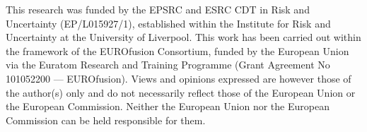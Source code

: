 \documentclass[twocolumn]{rps-esrel2022}
\begin{document}
\begin{acknowledgement}
This research was funded by the EPSRC and ESRC CDT in Risk and Uncertainty (EP/L015927/1), established within the Institute for Risk and Uncertainty at the University of Liverpool.
This work has been carried out within the framework of the EUROfusion Consortium, funded by the European Union via the Euratom Research and Training Programme (Grant Agreement No 101052200 — EUROfusion). Views and opinions expressed are however those of the author(s) only and do not necessarily reflect those of the European Union or the European Commission. Neither the European Union nor the European Commission can be held responsible for them.


\end{acknowledgement}
\end{document}
